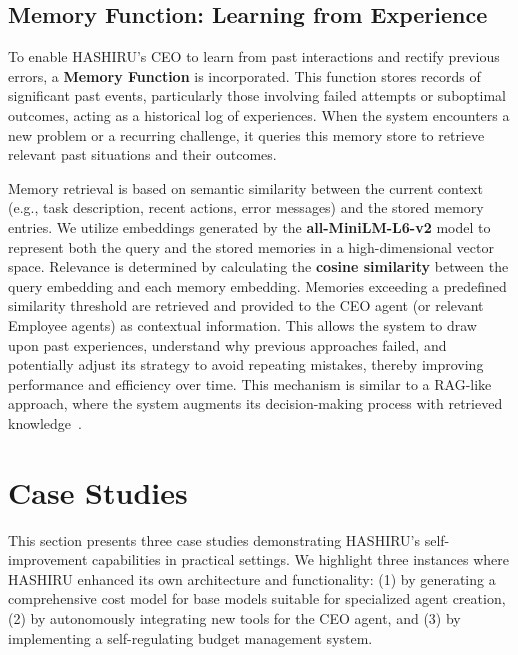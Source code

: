 \documentclass[conference]{IEEEtran}
\begin{document}
\subsection{Memory Function: Learning from Experience}
\label{subsec:memory}

To enable HASHIRU's CEO to learn from past interactions and rectify previous errors, a \textbf{Memory Function} is incorporated. This function stores records of significant past events, particularly those involving failed attempts or suboptimal outcomes, acting as a historical log of experiences. When the system encounters a new problem or a recurring challenge, it queries this memory store to retrieve relevant past situations and their outcomes.

Memory retrieval is based on semantic similarity between the current context (e.g., task description, recent actions, error messages) and the stored memory entries. We utilize embeddings generated by the \textbf{all-MiniLM-L6-v2} model \cite{wang2020minilmdeepselfattentiondistillation} to represent both the query and the stored memories in a high-dimensional vector space. Relevance is determined by calculating the \textbf{cosine similarity} between the query embedding and each memory embedding. Memories exceeding a predefined similarity threshold are retrieved and provided to the CEO agent (or relevant Employee agents) as contextual information. This allows the system to draw upon past experiences, understand why previous approaches failed, and potentially adjust its strategy to avoid repeating mistakes, thereby improving performance and efficiency over time. This mechanism is similar to a RAG-like approach, where the system augments its decision-making process with retrieved knowledge~\cite{lewis2020retrieval}.

\section{Case Studies}
\label{sec:casestudies}
This section presents three case studies demonstrating HASHIRU's self-improvement capabilities in practical settings. We highlight three instances where HASHIRU enhanced its own architecture and functionality: (1) by generating a comprehensive cost model for base models suitable for specialized agent creation, (2) by autonomously integrating new tools for the CEO agent, and (3) by implementing a self-regulating budget management system.
\end{document}
